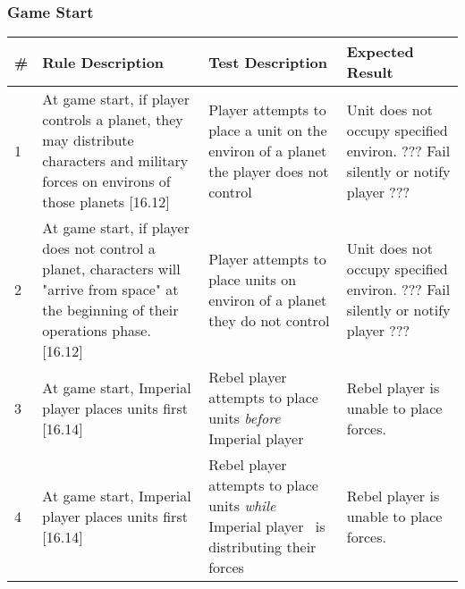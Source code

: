 \subsubsection{Game Start}
\begin{center}

  \begin{longtable}{| p{.5cm} | p{4.5cm} | p{4.5cm} | p{4.5cm} |}
    \hline
    \textbf{\#}&
    \textbf{Rule Description}&
    \textbf{Test Description}&
    \textbf{Expected Result}
    \\ \hline
    
    1 &

    At game start, if player controls a planet, they may distribute
    characters and military forces on environs of those planets
    [16.12] &

    Player attempts to place a unit on the environ of a planet the
    player does not control &

    Unit does not occupy specified environ.  ??? Fail silently or
    notify player ???

    \\ \hline

    2 &

    At game start, if player does not control a planet, characters
    will "arrive from space" at the beginning of their operations
    phase. [16.12] &

    Player attempts to place units on environ of a planet they do not
    control &

    Unit does not occupy specified environ.  ??? Fail silently or
    notify player ???

    \\ \hline 

    3 &

    At game start, Imperial player places units first [16.14] &

    Rebel player attempts to place units \textit{before} Imperial
    player &

    Rebel player is unable to place forces.

    \\ \hline

    4 &

    At game start, Imperial player places units first [16.14] &

    Rebel player attempts to place units \textit{while} Imperial
    player \ is distributing their forces &

    Rebel player is unable to place forces.
    

\end{longtable}
\end{center}
